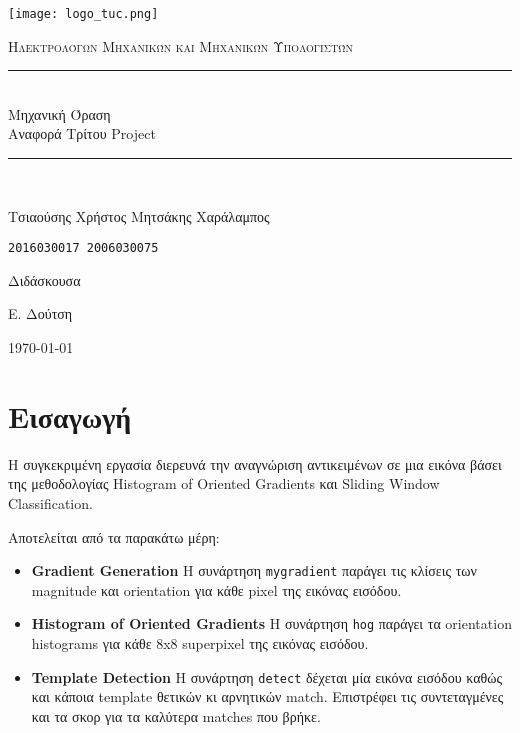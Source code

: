\documentclass[11pt]{scrartcl} %
\begin{document}
\begin{titlepage}
    \centering
    \texttt{[image: logo\_tuc.png]}\par\vspace{1cm}
    \normalfont\normalsize
    \textsc{\textcolor[rgb]{0.66, 0.09, 0.19}{Ηλεκτρολόγων Μηχανικών και Μηχανικών Υπολογιστών}}\\ %
    \vspace{25pt} %
    \rule{\linewidth}{0.5pt}\\ %
    \vspace{20pt} %
    {\Huge Μηχανική Όραση}\\ %

    {\huge Αναφορά Τρίτου Project}\\ %
    \vspace{12pt} %
    \rule{\linewidth}{2pt}\\ %
    \vspace{12pt} %
    \vspace{2cm}

    {\LARGE{Τσιαούσης Χρήστος \hfill Μητσάκης Χαράλαμπος}
        \par
        \texttt{2016030017 \hfill 2006030075}
        \par
    }

    \vfill
    Διδάσκουσα

    Ε. Δούτση

    \vfill

    {\large \today\par}
\end{titlepage}

\newpage



\section{Εισαγωγή}

Η συγκεκριμένη εργασία διερευνά την αναγνώριση αντικειμένων σε μια εικόνα
βάσει της μεθοδολογίας Histogram of Oriented Gradients και Sliding Window Classification.

Αποτελείται από τα παρακάτω μέρη:
\begin{itemize}
  \item \textbf{Gradient Generation} Η συνάρτηση \texttt{mygradient} παράγει τις κλίσεις των
  magnitude και orientation για κάθε pixel της εικόνας εισόδου.
  \item \textbf{Histogram of Oriented Gradients} Η συνάρτηση \texttt{hog} παράγει τα orientation
  histograms για κάθε 8x8 superpixel της εικόνας εισόδου.
  \item \textbf{Template Detection} Η συνάρτηση \texttt{detect} δέχεται μία εικόνα εισόδου καθώς
  και κάποια template θετικών κι αρνητικών match. Επιστρέφει τις συντεταγμένες και τα σκορ για
  τα καλύτερα matches που βρήκε.
\end{itemize}
\end{document}
